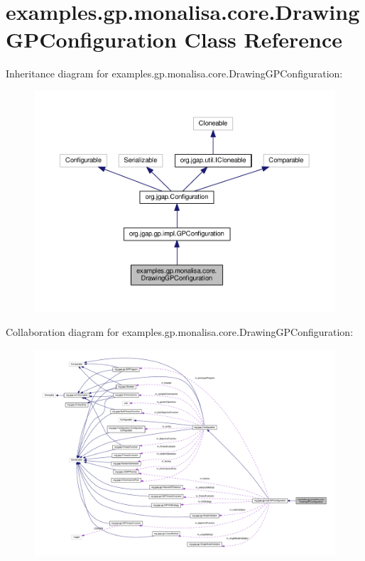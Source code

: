\hypertarget{classexamples_1_1gp_1_1monalisa_1_1core_1_1_drawing_g_p_configuration}{\section{examples.\-gp.\-monalisa.\-core.\-Drawing\-G\-P\-Configuration Class Reference}
\label{classexamples_1_1gp_1_1monalisa_1_1core_1_1_drawing_g_p_configuration}
}


Inheritance diagram for examples.\-gp.\-monalisa.\-core.\-Drawing\-G\-P\-Configuration\-:
\nopagebreak
\begin{figure}[H]
\begin{center}
\leavevmode
\includegraphics[width=350pt]{classexamples_1_1gp_1_1monalisa_1_1core_1_1_drawing_g_p_configuration__inherit__graph}
\end{center}
\end{figure}


Collaboration diagram for examples.\-gp.\-monalisa.\-core.\-Drawing\-G\-P\-Configuration\-:
\nopagebreak
\begin{figure}[H]
\begin{center}
\leavevmode
\includegraphics[width=350pt]{classexamples_1_1gp_1_1monalisa_1_1core_1_1_drawing_g_p_configuration__coll__graph}
\end{center}
\end{figure}
